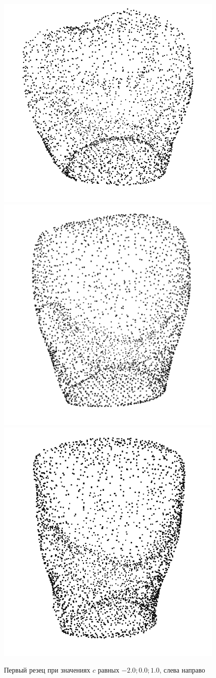 \begin{figure}[ht!]
    \includegraphics[width=.3\textwidth]{images/snapshot_11_-201.png}\hfill
    \includegraphics[width=.3\textwidth]{images/snapshot_mean00.png}\hfill
    \includegraphics[width=.3\textwidth]{images/snapshot_1100.png}
    \label{fig:gex4}
    \caption{Первый резец при значениях $c$ равных $-2.0; 0.0; 1.0$, слева направо}
\end{figure}

